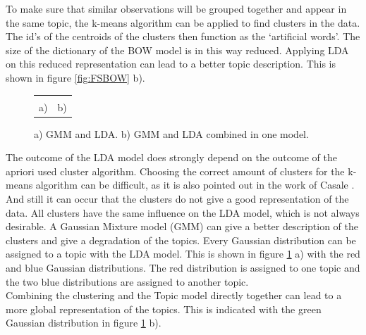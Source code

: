 To make sure that similar observations will be grouped together and appear in the same topic, the k-means algorithm can be applied to find clusters in the data. The id's of the centroids of the clusters then function as the `artificial words'. The size of the dictionary of the BOW model is in this way reduced. Applying LDA on this reduced representation can lead to a better topic description. This is shown in figure \ref{fig:FSBOW} b).\\

\begin{figure}[h]
\centering
\begin{tabular}{c c} 
\def\svgwidth{0.45\textwidth}  & \def\svgwidth{0.45\textwidth} \\
a) & b)
\end{tabular}
\caption{a) GMM and LDA. b) GMM and LDA combined in one model.}
\label{fig:GMM+LDA}
\end{figure}

The outcome of the LDA model does strongly depend on the outcome of the apriori used cluster algorithm. Choosing the correct amount of clusters for the k-means algorithm can be difficult, as it is also pointed out in the work of Casale \cite{Casale:2009}. And still it can occur that the clusters do not give a good representation of the data. All clusters have the same influence on the LDA model, which is not always desirable. A Gaussian Mixture model (GMM) can give a better description of the clusters and give a degradation of the topics. Every Gaussian distribution can be assigned to a topic with the LDA model. This is shown in figure \ref{fig:GMM+LDA} a) with the red and blue Gaussian distributions. The red distribution is assigned to one topic and the two blue distributions are assigned to another topic.\\

Combining the clustering and the Topic model directly together can lead to a more global representation of the topics. This is indicated with the green Gaussian distribution in figure \ref{fig:GMM+LDA} b). 



 

